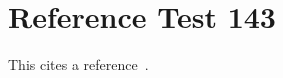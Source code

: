 \documentclass{article}
\begin{document}
\section{Reference Test 143}
This cites a reference~\cite{test143}.

\end{document}
